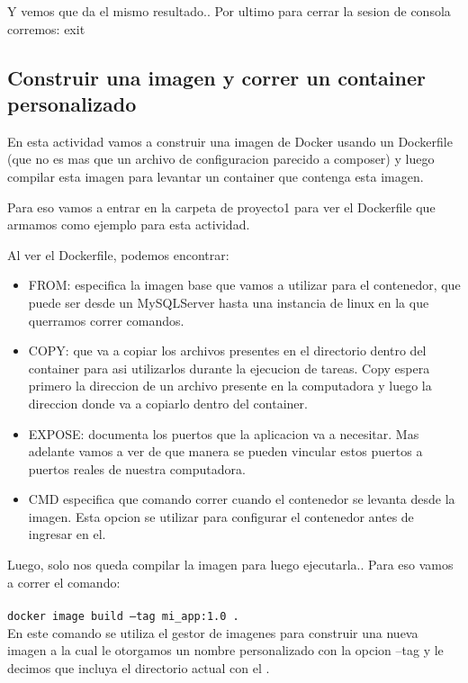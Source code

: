 \documentclass[11pt]{article} %
\begin{document}
Y vemos que da el mismo resultado.. Por ultimo para cerrar la sesion de consola corremos: exit


\subsection{Construir una imagen y correr un container personalizado}

En esta actividad vamos a construir una imagen de Docker usando un Dockerfile (que no es mas que un archivo de configuracion parecido a composer) y luego compilar esta imagen para levantar un container que contenga esta imagen. 

Para eso vamos a entrar en la carpeta de proyecto1 para ver el Dockerfile que armamos como ejemplo para esta actividad.

Al ver el Dockerfile, podemos encontrar:
\begin{itemize}
	\item
	FROM: especifica la imagen base que vamos a utilizar para el contenedor, que puede ser desde un MySQLServer hasta una instancia de linux en la que querramos correr comandos.

	\item
	COPY: que va a copiar los archivos presentes en el directorio dentro del container para asi utilizarlos durante la ejecucion de tareas.
	Copy espera primero la direccion de un archivo presente en la computadora y luego la direccion donde va a copiarlo dentro del container.
	
	\item	
	EXPOSE: documenta los puertos que la aplicacion va a necesitar. Mas adelante vamos a ver de que manera se pueden vincular estos puertos a puertos reales de nuestra computadora.
	
	\item
	CMD especifica que comando correr cuando el contenedor se levanta desde la imagen. Esta opcion se utilizar para configurar el contenedor antes de ingresar en el.
\end{itemize}


Luego, solo nos queda compilar la imagen para luego ejecutarla.. Para eso vamos a correr el comando: \\ \\
	\texttt{docker image build --tag mi\_app:1.0 .} \\

En este comando se utiliza el gestor de imagenes para construir una nueva imagen a la cual le otorgamos un nombre personalizado con la opcion --tag y le decimos que incluya el directorio actual con el .
\end{document}
